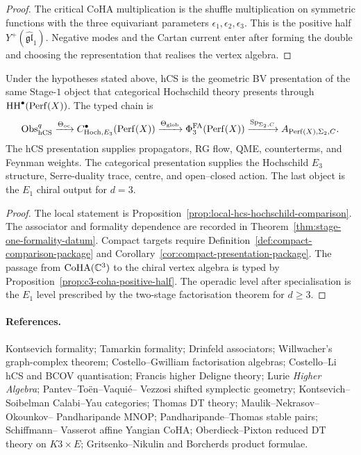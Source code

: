 \begin{proof}
The critical CoHA multiplication is the shuffle multiplication on
symmetric functions with the three equivariant parameters
$\epsilon_1,\epsilon_2,\epsilon_3$. This is the positive half
$Y^+(\widehat{\mathfrak{gl}}_1)$. Negative modes and the Cartan current
enter after forming the double and choosing the representation that
realises the vertex algebra.
\end{proof}

\begin{corollary}
\label{cor:hcs-geometric-resolution}
Under the hypotheses stated above, hCS is the geometric BV presentation
of the same Stage-$1$ object that categorical Hochschild theory presents
through $\mathrm{HH}^\bullet(\mathrm{Perf}(X))$. The typed chain is
\[
  \mathrm{Obs}_{\mathrm{hCS}}^{q}
  \xrightarrow{\Theta_{\mathrm{oc}}}
  C^\bullet_{\mathrm{Hoch},E_3}(\mathrm{Perf}(X))
  \xrightarrow{\Theta_{\mathrm{glob}}}
  \Phi^{\mathrm{FA}}_3(\mathrm{Perf}(X))
  \xrightarrow{\mathrm{Sp}_{\Sigma_2,C}}
  A_{\mathrm{Perf}(X),\Sigma_2,C}.
\]
The hCS presentation supplies propagators, RG flow, QME, counterterms,
and Feynman weights. The categorical presentation supplies the
Hochschild $E_3$ structure, Serre-duality trace, centre, and
open--closed action. The last object is the $E_1$ chiral output for
$d=3$.
\end{corollary}

\begin{proof}
The local statement is Proposition~\ref{prop:local-hcs-hochschild-comparison}.
The associator and formality dependence are recorded in
Theorem~\ref{thm:stage-one-formality-datum}. Compact targets require
Definition~\ref{def:compact-comparison-package} and
Corollary~\ref{cor:compact-presentation-package}. The passage from
$\mathrm{CoHA}(\mathbb C^3)$ to the chiral vertex algebra is typed by
Proposition~\ref{prop:c3-coha-positive-half}. The operadic level after
specialisation is the $E_1$ level prescribed by the two-stage
factorisation theorem for $d\geq3$.
\end{proof}

\paragraph{References.}
Kontsevich formality; Tamarkin formality; Drinfeld associators;
Willwacher's graph-complex theorem; Costello--Gwilliam factorisation
algebras; Costello--Li hCS and BCOV quantisation; Francis higher
Deligne theory; Lurie \emph{Higher Algebra}; Pantev--To\"en--Vaqui\'e--
Vezzosi shifted symplectic geometry; Kontsevich--Soibelman
Calabi--Yau categories; Thomas DT theory; Maulik--Nekrasov--Okounkov--
Pandharipande MNOP; Pandharipande--Thomas stable pairs; Schiffmann--
Vasserot affine Yangian CoHA; Oberdieck--Pixton reduced DT theory on
$K3\times E$; Gritsenko--Nikulin and Borcherds product formulae.
